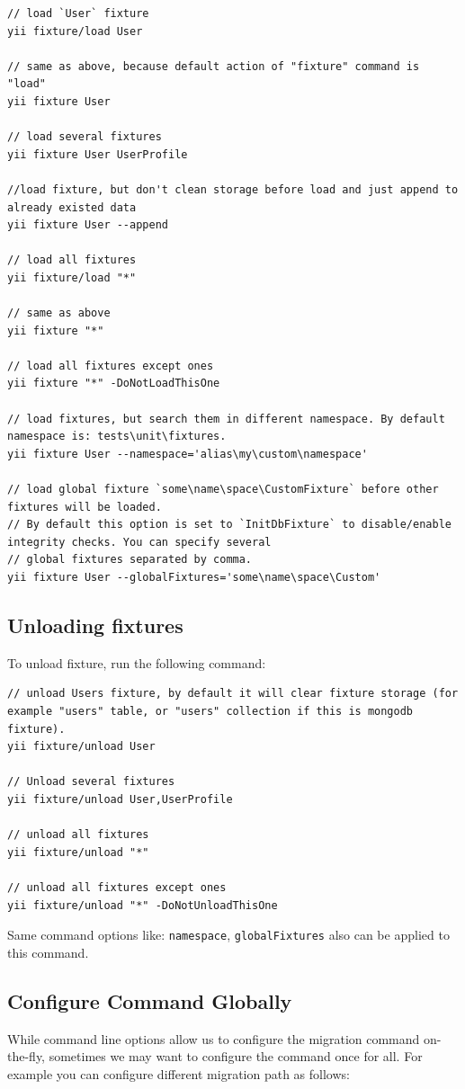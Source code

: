 \begin{lstlisting}
// load `User` fixture
yii fixture/load User

// same as above, because default action of "fixture" command is "load"
yii fixture User

// load several fixtures
yii fixture User UserProfile

//load fixture, but don't clean storage before load and just append to already existed data
yii fixture User --append

// load all fixtures
yii fixture/load "*"

// same as above
yii fixture "*"

// load all fixtures except ones
yii fixture "*" -DoNotLoadThisOne

// load fixtures, but search them in different namespace. By default namespace is: tests\unit\fixtures.
yii fixture User --namespace='alias\my\custom\namespace'

// load global fixture `some\name\space\CustomFixture` before other fixtures will be loaded.
// By default this option is set to `InitDbFixture` to disable/enable integrity checks. You can specify several
// global fixtures separated by comma.
yii fixture User --globalFixtures='some\name\space\Custom'
\end{lstlisting}
\subsection{Unloading fixtures}
To unload fixture, run the following command:

\begin{lstlisting}
// unload Users fixture, by default it will clear fixture storage (for example "users" table, or "users" collection if this is mongodb fixture).
yii fixture/unload User

// Unload several fixtures
yii fixture/unload User,UserProfile

// unload all fixtures
yii fixture/unload "*"

// unload all fixtures except ones
yii fixture/unload "*" -DoNotUnloadThisOne

\end{lstlisting}
Same command options like: \lstinline|namespace|, \lstinline|globalFixtures| also can be applied to this command.

\subsection{Configure Command Globally}
While command line options allow us to configure the migration command
on-the-fly, sometimes we may want to configure the command once for all. For example you can configure
different migration path as follows:


